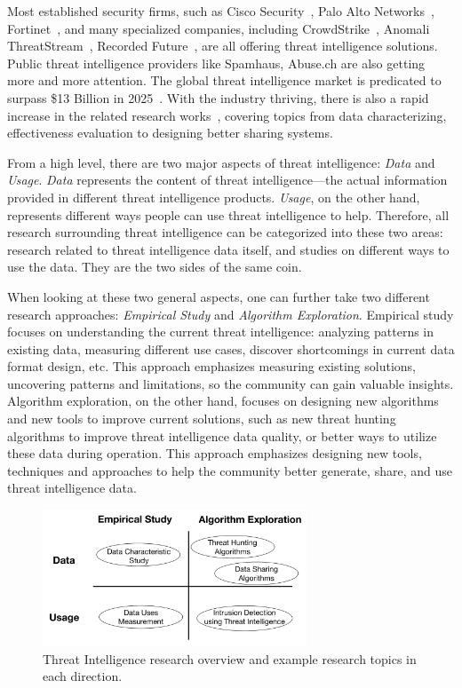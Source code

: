 Most established security firms, such as Cisco Security~\cite{ciscotalos}, 
Palo Alto Networks~\cite{panautofocus}, Fortinet~\cite{fortinet}, 
and many specialized companies, including CrowdStrike~\cite{crowdstrike}, 
Anomali ThreatStream~\cite{anomali}, Recorded Future~\cite{recordedfuture}, 
are all offering threat intelligence solutions. Public threat
intelligence providers like Spamhaus, Abuse.ch are also 
getting more and more attention. The global threat intelligence market is
predicated to surpass \$13 Billion in 2025~\cite{tipredict2018}. With the
industry thriving, there is also a rapid increase in the related research
works~\cite{tounsi2018survey}, covering topics from data characterizing,
effectiveness evaluation to designing better sharing systems. %

From a high level, there are two major aspects of threat intelligence: 
\textit{Data} and \textit{Usage}. \textit{Data} represents the content 
of threat intelligence---the actual information provided in different threat
intelligence products. \textit{Usage}, on the other hand, represents 
different ways people can use threat intelligence to help. Therefore, 
all research surrounding threat intelligence can be categorized into 
these two areas: research related to threat intelligence data itself, 
and studies on different ways to use the data. They are the two sides 
of the same coin.

When looking at these two general aspects, one can further 
take two different research approaches: \textit{Empirical Study} and 
\textit{Algorithm Exploration}. Empirical study focuses on 
understanding the current threat intelligence: analyzing patterns 
in existing data, measuring different use cases, discover shortcomings 
in current data format design, etc. This approach emphasizes measuring 
existing solutions, uncovering patterns and limitations, so the 
community can gain valuable insights. Algorithm exploration, 
on the other hand, focuses on designing new algorithms and new tools to 
improve current solutions, such as new threat hunting algorithms to improve 
threat intelligence data quality, or better ways to utilize these data 
during operation. This approach emphasizes designing new tools,
techniques and approaches to help the community better generate, share, 
and use threat intelligence data.

\begin{figure}
\centering
\includegraphics[width=0.7\textwidth]{threat_intel_overview_v2.pdf}
\caption{Threat Intelligence research overview and example research
topics in each direction.}
\label{fig:threat_intel_overview}
\end{figure}

